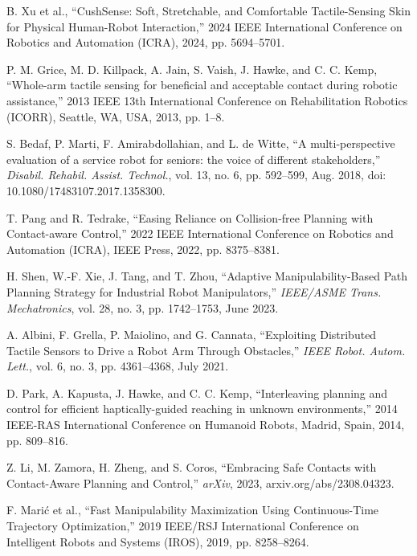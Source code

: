 \documentclass[conference]{IEEEtran}
\begin{document}
\begin{thebibliography}{00}
     B. Xu et al., ``CushSense: Soft, Stretchable, and Comfortable Tactile-Sensing Skin for Physical Human-Robot Interaction,'' 2024 IEEE International Conference on Robotics and Automation (ICRA), 2024, pp. 5694--5701.

     P. M. Grice, M. D. Killpack, A. Jain, S. Vaish, J. Hawke, and C. C. Kemp, ``Whole-arm tactile sensing for beneficial and acceptable contact during robotic assistance,'' 2013 IEEE 13th International Conference on Rehabilitation Robotics (ICORR), Seattle, WA, USA, 2013, pp. 1--8.
    
     S. Bedaf, P. Marti, F. Amirabdollahian, and L. de Witte, ``A multi-perspective evaluation of a service robot for seniors: the voice of different stakeholders,'' \textit{Disabil. Rehabil. Assist. Technol.}, vol. 13, no. 6, pp. 592--599, Aug. 2018, doi: 10.1080/17483107.2017.1358300.
    
     T. Pang and R. Tedrake, ``Easing Reliance on Collision-free Planning with Contact-aware Control,'' 2022 IEEE International Conference on Robotics and Automation (ICRA), IEEE Press, 2022, pp. 8375--8381.
    
     H. Shen, W.-F. Xie, J. Tang, and T. Zhou, ``Adaptive Manipulability-Based Path Planning Strategy for Industrial Robot Manipulators,'' \textit{IEEE/ASME Trans. Mechatronics}, vol. 28, no. 3, pp. 1742--1753, June 2023.
    
     A. Albini, F. Grella, P. Maiolino, and G. Cannata, ``Exploiting Distributed Tactile Sensors to Drive a Robot Arm Through Obstacles,'' \textit{IEEE Robot. Autom. Lett.}, vol. 6, no. 3, pp. 4361--4368, July 2021.
    
     D. Park, A. Kapusta, J. Hawke, and C. C. Kemp, ``Interleaving planning and control for efficient haptically-guided reaching in unknown environments,'' 2014 IEEE-RAS International Conference on Humanoid Robots, Madrid, Spain, 2014, pp. 809--816.
    
     Z. Li, M. Zamora, H. Zheng, and S. Coros, ``Embracing Safe Contacts with Contact-Aware Planning and Control,'' \textit{arXiv}, 2023, arxiv.org/abs/2308.04323.
    
     F. Marić et al., ``Fast Manipulability Maximization Using Continuous-Time Trajectory Optimization,'' 2019 IEEE/RSJ International Conference on Intelligent Robots and Systems (IROS), 2019, pp. 8258--8264.
    

\end{thebibliography}
\end{document}
